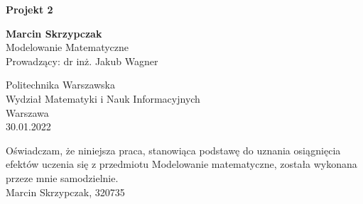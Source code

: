 \documentclass[12pt]{article}
\begin{document}
\begin{titlepage}
       \begin{center}
       \vspace*{1cm}
       
       \textbf{Projekt 2}   
       
       \vspace{1.5cm}
       
       \textbf{Marcin Skrzypczak} \\
        Modelowanie Matematyczne \\
        Prowadzący: dr inż. Jakub Wagner
        
       \vfill       
       
       Politechnika Warszawska\\       
       Wydział Matematyki i Nauk Informacyjnych\\
       Warszawa \\
       30.01.2022 \\
       
       \vspace{1.5cm}

   \end{center}
          Oświadczam, że niniejsza praca, stanowiąca podstawę do uznania osiągnięcia efektów uczenia się z przedmiotu  Modelowanie matematyczne, została wykonana przeze mnie samodzielnie. \\
          Marcin Skrzypczak, 320735
\end{titlepage}

\tableofcontents
\break
\end{document}

